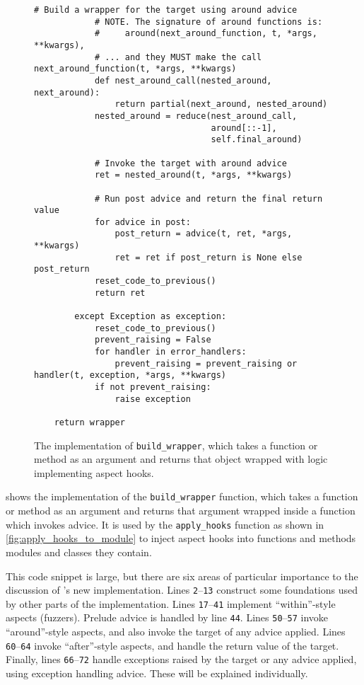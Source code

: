 \begin{figure}
\begin{lstlisting}[style=footnotesize_python]
            # Build a wrapper for the target using around advice
            # NOTE. The signature of around functions is:
            #     around(next_around_function, t, *args, **kwargs),
            # ... and they MUST make the call next_around_function(t, *args, **kwargs)
            def nest_around_call(nested_around, next_around):
                return partial(next_around, nested_around)
            nested_around = reduce(nest_around_call,
                                   around[::-1],
                                   self.final_around)

            # Invoke the target with around advice
            ret = nested_around(t, *args, **kwargs)
            
            # Run post advice and return the final return value
            for advice in post:
                post_return = advice(t, ret, *args, **kwargs)
                ret = ret if post_return is None else post_return
            reset_code_to_previous()
            return ret

        except Exception as exception:
            reset_code_to_previous()
            prevent_raising = False
            for handler in error_handlers:
                prevent_raising = prevent_raising or handler(t, exception, *args, **kwargs)
            if not prevent_raising:
                raise exception

    return wrapper
    \end{lstlisting}
    \caption{The implementation of \lstinline{build_wrapper}, which takes a
    function or method as an argument and returns that object wrapped with logic
    implementing aspect hooks.}
    \label{fig:build_wrapper_impl}
\end{figure}

 shows the implementation of the
\lstinline{build_wrapper} function, which takes a function or method as an
argument and returns that argument wrapped inside a function which invokes
advice. It is used by the \lstinline{apply_hooks} function as shown in
\cref{fig:apply_hooks_to_module} to inject aspect hooks into functions and
methods modules and classes they contain.

This code snippet is large, but there are six areas of particular importance to
the discussion of \pdsf{}'s new implementation. Lines \texttt{2}--\texttt{13}
construct some foundations used by other parts of the implementation. Lines
\texttt{17}--\texttt{41} implement ``within''-style aspects (fuzzers). Prelude
advice is handled by line \texttt{44}. Lines
\texttt{50}--\texttt{57} invoke ``around''-style aspects, and also invoke the target
of any advice applied. Lines
\texttt{60}--\texttt{64} invoke ``after''-style aspects, and handle the return
value of the target. Finally, lines \texttt{66}--\texttt{72} handle exceptions
raised by the target or any advice applied, using exception handling advice.
These will be explained individually.

